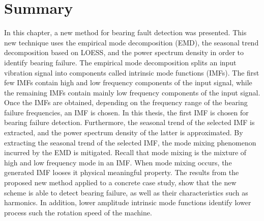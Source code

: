 \documentclass[../Main/thesis.tex]{subfiles}
\begin{document}
\section{Summary}
\label{sec:limitation}
In this chapter, a new method for bearing fault detection was presented. This new technique uses the empirical mode decomposition (EMD), the seasonal trend decomposition based on LOESS, and the power spectrum density in order to identify bearing failure. The empirical mode decomposition splits an input vibration signal into components called intrinsic mode functions (IMFs). The first few IMFs contain high and low frequency components of the input signal, while the remaining IMFs contain mainly low frequency components of the input signal.
\justify
Once the IMFs are obtained, depending on the frequency range of the bearing failure frequencies, an IMF is chosen. In this thesis, the first IMF is chosen for bearing failure detection. Furthermore, the seasonal trend of the selected IMF is extracted, and the power spectrum density of the latter is approximated. By extracting the seasonal trend of the selected IMF, the mode mixing phenomenon incurred by the EMD is mitigated. Recall that mode mixing is the mixture of high and low frequency mode in an IMF. When mode mixing occurs, the generated IMF looses it physical meaningful property. 
\justify
The results from the proposed new method applied to a concrete case study, show that the new scheme is able to detect bearing failure, as well as their characteristics such as harmonics. In addition, lower amplitude intrinsic mode functions identify lower process such the rotation speed of the machine.
\justify










\blankpage
\end{document}
